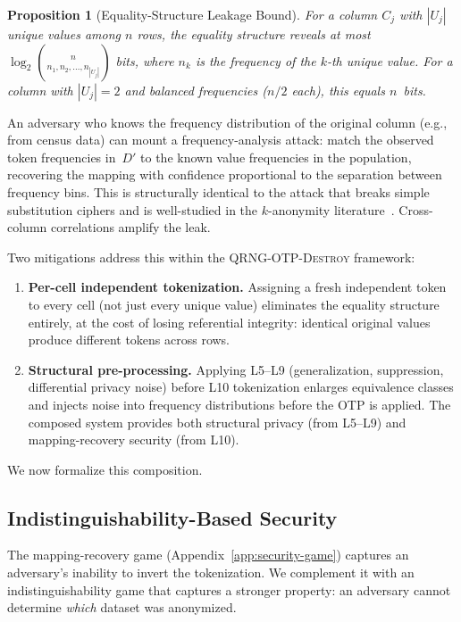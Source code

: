 \documentclass[journal]{IEEEtran}
\newtheorem{proposition}[theorem]{Proposition}
\begin{document}
\begin{proposition}[Equality-Structure Leakage Bound]
\label{prop:equality}
For a column $C_j$ with $|U_j|$ unique values among $n$ rows, the equality structure reveals at most $\log_2 \binom{n}{n_1, n_2, \ldots, n_{|U_j|}}$ bits, where $n_k$ is the frequency of the $k$-th unique value. For a column with $|U_j| = 2$ and balanced frequencies ($n/2$ each), this equals $n$~bits.
\end{proposition}

An adversary who knows the frequency distribution of the original column (e.g., from census data) can mount a frequency-analysis attack: match the observed token frequencies in~$D'$ to the known value frequencies in the population, recovering the mapping with confidence proportional to the separation between frequency bins. This is structurally identical to the attack that breaks simple substitution ciphers and is well-studied in the $k$-anonymity literature~\cite{narayanan2008robust}. Cross-column correlations amplify the leak.

Two mitigations address this within the \textsc{QRNG-OTP-Destroy} framework:
\begin{enumerate}
\item \textbf{Per-cell independent tokenization.} Assigning a fresh independent token to every cell (not just every unique value) eliminates the equality structure entirely, at the cost of losing referential integrity: identical original values produce different tokens across rows.
\item \textbf{Structural pre-processing.} Applying L5--L9 (generalization, suppression, differential privacy noise) before L10 tokenization enlarges equivalence classes and injects noise into frequency distributions before the OTP is applied. The composed system provides both structural privacy (from L5--L9) and mapping-recovery security (from L10).
\end{enumerate}

We now formalize this composition.

\subsection{Indistinguishability-Based Security}
\label{subsec:ind-anon}

The mapping-recovery game (Appendix~\ref{app:security-game}) captures an adversary's inability to invert the tokenization. We complement it with an indistinguishability game that captures a stronger property: an adversary cannot determine \emph{which} dataset was anonymized.
\end{document}
